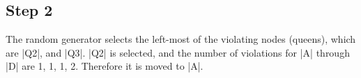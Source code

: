 \documentclass{homework}
\begin{document}
\begin{figure}[h!]
    \centering
    \qquad
    \label{fig:q32}
\end{figure}

\subsection{Step 2}
The random generator selects the left-most of the violating nodes (queens), which are \cverb|Q2|, and \cverb|Q3|.
\cverb|Q2| is selected, and the number of violations for \cverb|A| through \cverb|D| are 1, 1, 1, 2. Therefore it is moved to \cverb|A|.


\begin{figure}[h!]
    \centering
    \qquad
    \label{fig:q32}
\end{figure}
\end{document}
